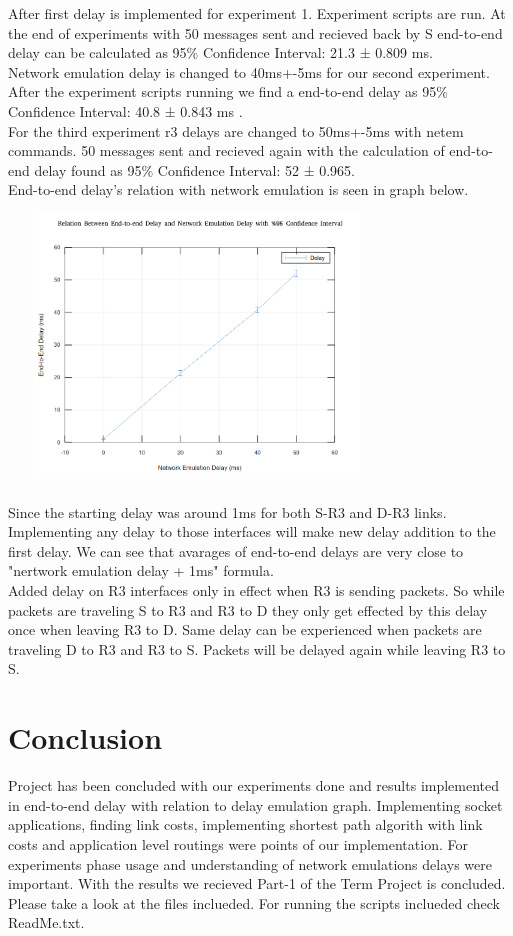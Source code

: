 \documentclass[conference]{IEEEtran}
\begin{document}
After first delay is implemented for experiment 1. Experiment scripts are run. At the end of experiments with 50 messages sent and recieved back by S end-to-end delay can be calculated as 95\% Confidence Interval: 21.3 ± 0.809 ms.\\ 

Network emulation delay is changed to 40ms+-5ms for our second experiment. After the experiment scripts running we find a end-to-end delay as 95\% Confidence Interval: 40.8 ± 0.843 ms .\\

For the third experiment r3 delays are changed to 50ms+-5ms with netem commands. 50 messages sent and recieved again with the calculation of end-to-end delay found as 95\% Confidence Interval: 52 ± 0.965.\\

End-to-end delay's relation with network emulation is seen in graph below.


\includegraphics[width = 100mm, height = 70mm]{end_delay.png}\\ \qquad \\

Since the starting delay was around 1ms for both S-R3 and D-R3 links. Implementing any delay to those interfaces will make new delay addition to the first delay. We can see that avarages of end-to-end delays are very close to "nertwork emulation delay + 1ms" formula. \\

Added delay on R3 interfaces only in effect when R3 is sending packets. So while packets are traveling S to R3 and R3 to D they only get effected by this delay once when leaving R3 to D. Same delay can be experienced when packets are traveling D to R3 and R3 to S. Packets will be delayed again while leaving R3 to S.\\ 

\section{Conclusion}

Project has been concluded with our experiments done and results implemented in end-to-end delay with relation to delay emulation graph. Implementing socket applications, finding link costs, implementing shortest path algorith with link costs and application level routings were points of our implementation. For experiments phase usage and understanding of network emulations delays were important. With the results we recieved Part-1 of the Term Project is concluded. Please take a look at the files inclueded. For running the scripts inclueded check ReadMe.txt.
\end{document}
